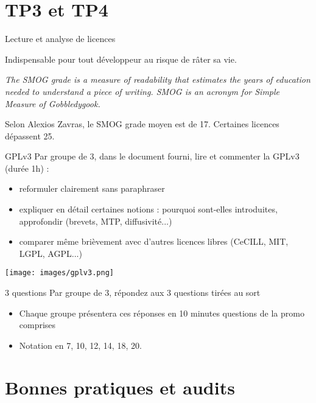 \documentclass{beamer}
\begin{document}
\section{TP3 et TP4}


\begin{frame}{Lecture et analyse de licences}

Indispensable pour tout développeur au risque de râter sa vie.

\textit{The SMOG grade is a measure of readability that estimates the years of education needed to understand a piece of writing. SMOG is an acronym for Simple Measure of Gobbledygook.}

Selon Alexios Zavras, le SMOG grade moyen est de 17. Certaines licences dépassent 25.

\end{frame}


\begin{frame}{GPLv3}
  Par groupe de 3, dans le document fourni, lire et commenter la GPLv3 (durée 1h) :
  \begin{itemize}
    \item reformuler clairement sans paraphraser
    \item expliquer en détail certaines notions : pourquoi sont-elles introduites, approfondir (brevets, MTP, diffusivité...)
    \item comparer même brièvement avec d'autres licences libres (CeCILL, MIT, LGPL, AGPL...)
   \end{itemize}

  \begin{center}
    \texttt{[image: images/gplv3.png]}
\end{center}
\end{frame}


\begin{frame}{3 questions}
 Par groupe de 3, répondez aux 3 questions tirées au sort
 \begin{itemize}
 \item Chaque groupe présentera ces réponses en 10 minutes
   questions de la promo comprises
 \item Notation en 7, 10, 12, 14, 18, 20.
 \end{itemize}
\end{frame}



\section{Bonnes pratiques et audits}
\end{document}
